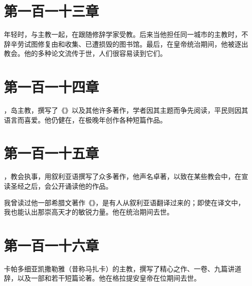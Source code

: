 \section{第一百一十三章}

年轻时，与主教一起，在跟随修辞学家受教。后来当他担任同一城市的主教时，不辞辛劳试图修复由和收集、已遭损毁的图书馆。最后，在皇帝统治期间，他被逐出教会。他的多种论文流传于世，人们很容易读到它们。\par


\section{第一百一十四章}

，岛主教，撰写了《》以及其他许多著作，学者因其主题而争先阅读，平民则因其语言而喜爱。他仍健在，在极晚年创作各种短篇作品。\par


\section{第一百一十五章}

，教会执事，用叙利亚语撰写了众多著作，他声名卓著，以致在某些教会中，在宣读圣经之后，会公开诵读他的作品。\par

我曾读过他一部希腊文著作《》，是有人从叙利亚语翻译过来的；即使在译文中，我也能认出那崇高天才的敏锐力量。他在统治期间去世。\par


\section{第一百一十六章}

卡帕多细亚凯撒勒雅（昔称马扎卡）的主教，撰写了精心之作、一卷、九篇讲道辞，以及一部和若干短篇论著。他在格拉提安皇帝在位期间去世。\par

